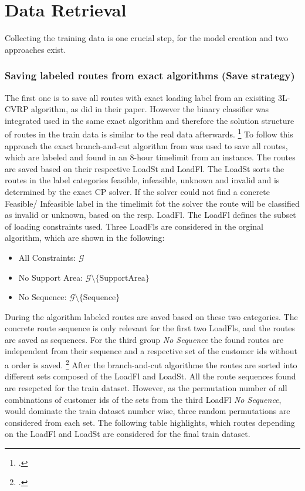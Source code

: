 \section{Data Retrieval}
\label{sec:DataRetrieval}
Collecting the training data is one crucial step, for the model creation and two approaches exist.

\subsubsection{Saving labeled routes from exact algorithms (Save strategy)}
The first one is to save all routes with exact loading label from an exisiting \gls{3L-CVRP}
algorithm, as \cite{zhang_learning-based_2022} did in their paper. However the binary classifier
was integrated used in the same exact algorithm
and therefore the solution structure of routes in the train data is similar to the real data afterwards. \footcite[cf.][]{zhang_learning-based_2022}
To follow this approach the exact branch-and-cut algorithm from \cite{tamke_branch-and-cut_2024} was
used to save all routes, which are labeled and found in an 8-hour timelimit from an instance. The routes
are saved based on their respective \gls{LoadSt} and \gls{LoadFl}. The \gls{LoadSt} sorts the routes in the
label categories feasible, infeasible, unknown and invalid and is determined by the exact \gls{CP} solver.
If the solver could not find a concrete Feasible/ Infeasible label in the timelimit fot the solver the route
will be classified as invalid or unknown, based on the resp. \gls{LoadFl}.
The \gls{LoadFl} defines the subset of
loading constraints used. Three \glspl{LoadFl} are considered in the orginal algorithm, which are shown
in the following:
\begin{itemize}
    \item All Constraints: $\mathcal{G}$
    \item No Support Area: $\mathcal{G}\setminus \{\text{SupportArea}\}$
    \item No Sequence: $\mathcal{G}\setminus \{\text{Sequence}\}$
\end{itemize}
During the algorithm labeled routes are saved based on these two categories. The concrete route sequence
is only relevant for the first two \glspl{LoadFl}, and the routes are saved as sequences. For the third
group \textit{No Sequence} the found routes are independent from their sequence and a respective set
of the customer ids without a order is saved. \footcites[Retrieved from][]{tamke_repository_2024}[cf.][]{tamke_branch-and-cut_2024}
After the branch-and-cut algorithme the routes are sorted into different sets composed of the \gls{LoadFl} and \gls{LoadSt}.
All the route sequences found are resepcted for the train dataset. However, as the permutation number of all combinations
of customer ids of the sets from the third \gls{LoadFl} \textit{No Sequence}, would dominate the train dataset number wise,
three random permutations are considered from each set. The following table highlights, which routes depending on the
\gls{LoadFl} and \gls{LoadSt} are considered for the final train dataset.

